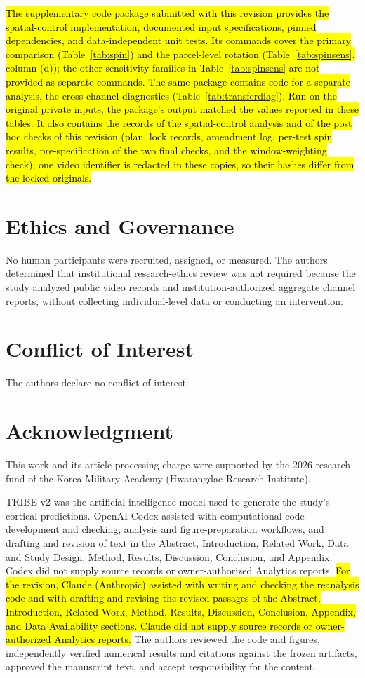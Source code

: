 \documentclass{ieeeaccess}
\newcommand{\rev}[1]{\hl{#1}}
\newcommand{\rev}[1]{#1}
\begin{document}
\rev{The supplementary code package submitted with this revision provides the spatial-control implementation, documented input specifications, pinned dependencies, and data-independent unit tests. Its commands cover the primary comparison (\mbox{Table~\ref{tab:spin}}) and the parcel-level rotation (\mbox{Table~\ref{tab:spinsens}}, column (d)); the other sensitivity families in \mbox{Table~\ref{tab:spinsens}} are not provided as separate commands. The same package contains code for a separate analysis, the cross-channel diagnostics (\mbox{Table~\ref{tab:transferdiag}}). Run on the original private inputs, the package's output matched the values reported in these tables. It also contains the records of the spatial-control analysis and of the post hoc checks of this revision (plan, lock records, amendment log, per-test spin results, pre-specification of the two final checks, and the window-weighting check); one video identifier is redacted in these copies, so their hashes differ from the locked originals.}

\section*{Ethics and Governance}
No human participants were recruited, assigned, or measured. The authors determined that institutional research-ethics review was not required because the study analyzed public video records and institution-authorized aggregate channel reports, without collecting individual-level data or conducting an intervention.

\section*{Conflict of Interest}
The authors declare no conflict of interest.

\section*{Acknowledgment}
This work and its article processing charge were supported by the 2026 research fund of the Korea Military Academy (Hwarangdae Research Institute).

TRIBE v2 was the artificial-intelligence model used to generate the study's cortical predictions. OpenAI Codex assisted with computational code development and checking, analysis and figure-preparation workflows, and drafting and revision of text in the Abstract, Introduction, Related Work, Data and Study Design, Method, Results, Discussion, Conclusion, and Appendix. Codex did not supply source records or owner-authorized Analytics reports. \rev{For the revision, Claude (Anthropic) assisted with writing and checking the reanalysis code and with drafting and revising the revised passages of the Abstract, Introduction, Related Work, Method, Results, Discussion, Conclusion, Appendix, and Data Availability sections. Claude did not supply source records or owner-authorized Analytics reports.} The authors reviewed the code and figures, independently verified numerical results and citations against the frozen artifacts, approved the manuscript text, and accept responsibility for the content.
\end{document}
